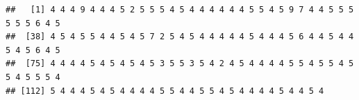 \documentclass[
  11pt,
]{book}
\newenvironment{Shaded}{\begin{snugshade}}{\end{snugshade}}
\newcommand{\AttributeTok}[1]{\textcolor[rgb]{0.77,0.63,0.00}{#1}}
\newcommand{\CommentTok}[1]{\textcolor[rgb]{0.56,0.35,0.01}{\textit{#1}}}
\newcommand{\DecValTok}[1]{\textcolor[rgb]{0.00,0.00,0.81}{#1}}
\newcommand{\FunctionTok}[1]{\textcolor[rgb]{0.00,0.00,0.00}{#1}}
\newcommand{\NormalTok}[1]{#1}
\newcommand{\OtherTok}[1]{\textcolor[rgb]{0.56,0.35,0.01}{#1}}
\newcommand{\SpecialCharTok}[1]{\textcolor[rgb]{0.00,0.00,0.00}{#1}}
\theoremstyle{definition}
\theoremstyle{definition}
\theoremstyle{definition}
\theoremstyle{definition}
\theoremstyle{remark}
\begin{document}
\begin{Shaded}
\end{Shaded}

\begin{verbatim}
##   [1] 4 4 4 9 4 4 4 5 2 5 5 5 4 5 4 4 4 4 4 4 5 5 4 5 9 7 4 4 5 5 5 5 5 5 6 4 5
##  [38] 4 5 4 5 5 4 4 5 4 5 7 2 5 4 5 4 4 4 4 4 5 4 4 4 5 6 4 4 5 4 4 5 4 5 6 4 5
##  [75] 4 4 4 4 5 4 5 4 5 4 5 3 5 5 3 5 4 2 4 5 4 4 4 4 5 5 4 5 5 4 5 5 4 5 5 5 4
## [112] 5 4 4 4 5 4 5 4 4 4 4 5 5 4 4 5 5 4 5 4 4 4 4 5 4 4 5 4
\end{verbatim}
\end{document}
